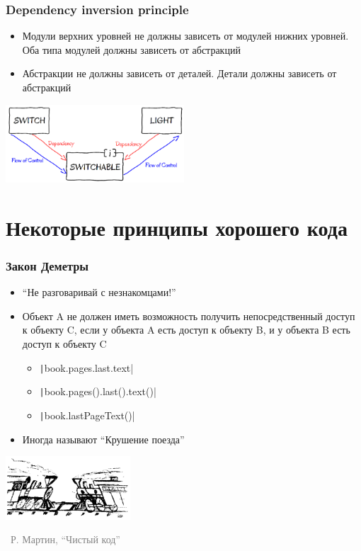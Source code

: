 \documentclass[xetex,mathserif,serif]{beamer}
\newcommand{\attribution}[1] {
    \begin{flushright}\begin{scriptsize}\textcolor{gray}{\textcopyright\, #1}\end{scriptsize}\end{flushright}
}
\begin{document}
    \begin{frame}
        \frametitle{Dependency inversion principle}
        \begin{itemize}
            \item Модули верхних уровней не должны зависеть от модулей нижних уровней. Оба типа модулей должны зависеть от абстракций
            \item Абстракции не должны зависеть от деталей. Детали должны зависеть от абстракций
        \end{itemize}
        \begin{flushright}
            \includegraphics[width=0.5\textwidth]{dependencyInversionPrinciple.png}
        \end{flushright}
    \end{frame}

    \section{Некоторые принципы хорошего кода}

    \begin{frame}
        \frametitle{Закон Деметры}
        \begin{itemize}
            \item ``Не разговаривай с незнакомцами!''
            \item Объект A не должен иметь возможность получить непосредственный доступ к объекту C, если у объекта A есть доступ к объекту B, и у объекта B есть доступ к объекту C
            \begin{itemize}
                \item \texttt|book.pages.last.text|
                \item \texttt|book.pages().last().text()|
                \item \texttt|book.lastPageText()|
            \end{itemize}
            \item Иногда называют ``Крушение поезда''
        \end{itemize}
        \begin{flushright}
            \includegraphics[width=0.35\textwidth]{trains.png}
        \end{flushright}
        \vspace{-0.8cm}
        \attribution{Р. Мартин, ``Чистый код''}
    \end{frame}
\end{document}
